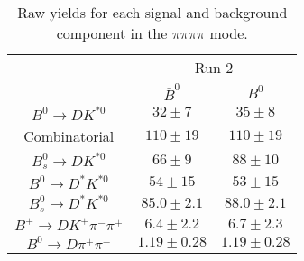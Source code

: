 \begin{table}
  \centering
  \begin{tabular}{ccc}
      \toprule
       & \multicolumn{2}{c}{Run 2} \\
      & $\bar{B}^0$ & $B^0$ \\
      \midrule
      $B^0 \to DK^{*0}$ & $32 \pm 7$ & $35 \pm 8$ \\
      Combinatorial & $110 \pm 19$ & $110 \pm 19$ \\
      $B^0_s \to DK^{*0}$ & $66 \pm 9$ & $88 \pm 10$ \\
      $B^0 \to D^*K^{*0}$ & $54 \pm 15$ & $53 \pm 15$ \\
      $B^0_s \to D^*K^{*0}$ & $85.0 \pm 2.1$ & $88.0 \pm 2.1$ \\
      $B^+ \to DK^+\pi^-\pi^+$ & $6.4 \pm 2.2$ & $6.7 \pm 2.3$ \\
      $B^0 \to D\pi^+\pi^-$ & $1.19 \pm 0.28$ & $1.19 \pm 0.28$ \\
      \bottomrule
      \end{tabular}
\caption{Raw yields for each signal and background component in the $\pi\pi\pi\pi$ mode.}
\label{tab:yields_pipipipi}
\end{table}
